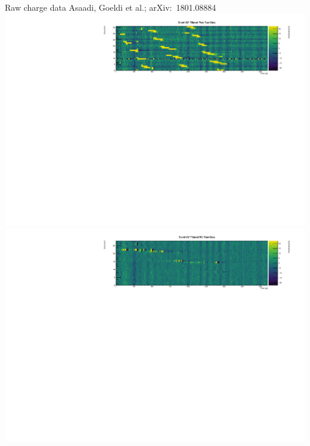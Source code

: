 \documentclass[]{beamer}
\begin{document}
\begin{frame}{Raw charge data}{}
	{\tiny Asaadi, Goeldi et al.; arXiv:~1801.08884~\cite{pixel_paper}}\\
	\centering
	\includegraphics[width=\textwidth]{defence/event967_rawFilteredPixel}\\
	\includegraphics[width=\textwidth]{defence/event967_rawFilteredROI}
\end{frame}
\end{document}
